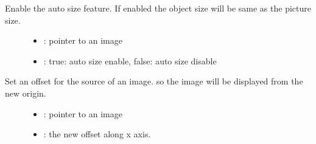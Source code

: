 \documentclass[letterpaper,10pt,english]{sphinxmanual}
\begin{document}

\begin{fulllineitems}
\label{\detokenize{object-types/img:_CPPv420lv_img_set_auto_sizeP8lv_obj_tb}}%
\pysigstartmultiline
{}\label{\detokenize{object-types/img:lv__img_8h_1a351e2b2ca7efde72d2cb7d776b22fca0}}%
\pysigstopmultiline
Enable the auto size feature. If enabled the object size will be same as the picture size. \begin{description}
\item[{}] \leavevmode\begin{itemize}
\item {} 
: pointer to an image 

\item {} 
: true: auto size enable, false: auto size disable 

\end{itemize}

\end{description}


\end{fulllineitems}


\begin{fulllineitems}
\label{\detokenize{object-types/img:_CPPv419lv_img_set_offset_xP8lv_obj_t10lv_coord_t}}%
\pysigstartmultiline
{}\label{\detokenize{object-types/img:lv__img_8h_1ace5599e07bdf4be8f0fa57434e6beee9}}%
\pysigstopmultiline
Set an offset for the source of an image. so the image will be displayed from the new origin. \begin{description}
\item[{}] \leavevmode\begin{itemize}
\item {} 
: pointer to an image 

\item {} 
: the new offset along x axis. 

\end{itemize}

\end{description}


\end{fulllineitems}
\end{document}
